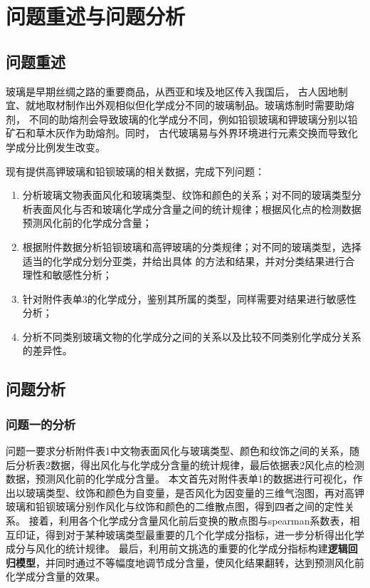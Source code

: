 \documentclass[withoutpreface,bwprint]{cumcmthesis} %
\begin{document}
\setcounter{page}{1}    

\section{问题重述与问题分析}
\subsection{问题重述}
玻璃是早期丝绸之路的重要商品，从西亚和埃及地区传入我国后， 古人因地制宜、就地取材制作出外观相似但化学成分不同的玻璃制品。玻璃炼制时需要助熔剂， 不同的助熔剂会导致玻璃的化学成分不同，例如铅钡玻璃和钾玻璃分别以铅矿石和草木灰作为助熔剂。同时， 古代玻璃易与外界环境进行元素交换而导致化学成分比例发生改变。


现有提供高钾玻璃和铅钡玻璃的相关数据，完成下列问题：


\begin{enumerate}
	\item 分析玻璃文物表面风化和玻璃类型、纹饰和颜色的关系；对不同的玻璃类型分析表面风化与否和玻璃化学成分含量之间的统计规律；根据风化点的检测数据预测风化前的化学成分含量；
	\item 根据附件数据分析铅钡玻璃和高钾玻璃的分类规律；对不同的玻璃类型，选择适当的化学成分划分亚类，并给出具体 的方法和结果，并对分类结果进行合理性和敏感性分析；
	\item 针对附件表单3的化学成分，鉴别其所属的类型，同样需要对结果进行敏感性分析；
	\item 分析不同类别玻璃文物的化学成分之间的关系以及比较不同类别化学成分关系的差异性。
\end{enumerate}


\subsection{问题分析}


\subsubsection{问题一的分析}

问题一要求分析附件表1中文物表面风化与玻璃类型、颜色和纹饰之间的关系，随后分析表2数据，得出风化与化学成分含量的统计规律，最后依据表2风化点的检测数据，预测风化前的化学成分含量。 本文首先对附件表单1的数据进行可视化，作出以玻璃类型、纹饰和颜色为自变量，是否风化为因变量的三维气泡图，再对高钾玻璃和铅钡玻璃分别作风化与纹饰和颜色的二维散点图，得到四者之间的定性关系。 接着，利用各个化学成分含量风化前后变换的散点图与spearman系数表，相互印证，得到对于某种玻璃类型最重要的几个化学成分指标，进一步分析得出化学成分与风化的统计规律。 最后，利用前文挑选的重要的化学成分指标构建\textbf{逻辑回归模型}，并同时通过不等幅度地调节成分含量，使风化结果翻转，达到预测风化前化学成分含量的效果。
\end{document}

